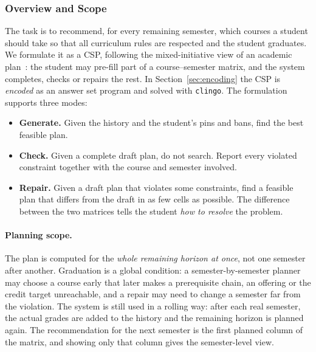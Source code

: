 \documentclass[10pt,a4paper]{article}
\begin{document}
      \subsubsection{Overview and Scope}\label{sec:scope}
The task is to recommend, for every remaining semester, which courses a student should take so that all curriculum rules are respected and the student graduates. We formulate it as a CSP, following the mixed-initiative view of an academic plan~\cite{wu2005curriculum}: the student may pre-fill part of
a course--semester matrix, and the system completes, checks or repairs the rest. In Section~\ref{sec:encoding} the CSP is \emph{encoded} as an answer set program and solved with \texttt{clingo}. The formulation supports three modes:
\begin{itemize}
      \item{\textbf{Generate.}} Given the history and the student's pins and bans, find the best feasible plan.
      \item{\textbf{Check.}} Given a complete draft plan, do not search. Report every violated constraint together with the course and semester involved.
      \item{\textbf{Repair.}} Given a draft plan that violates some constraints, find a feasible plan that differs from the draft in as few cells as possible. The difference between the two matrices tells the student \emph{how to resolve} the problem.
\end{itemize}

\paragraph{Planning scope.}
The plan is computed for the \emph{whole remaining horizon at once}, not one semester after another. Graduation is a global condition: a semester-by-semester planner may choose a course early that later makes a prerequisite chain, an offering or the credit target unreachable, and a repair may need to change a semester far from the violation. The system is still used in a rolling way: after each real semester, the
actual grades are added to the history and the remaining horizon is planned again. The recommendation for the next semester is the first planned column of the matrix, and showing only that column gives the semester-level view.
\end{document}
